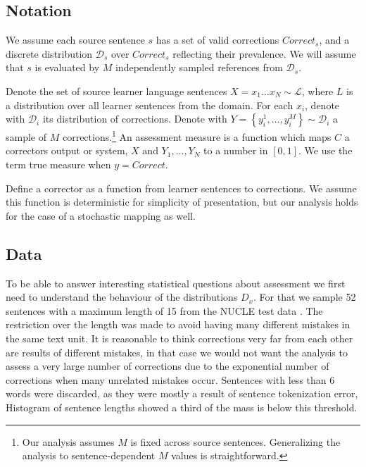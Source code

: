 \documentclass[letter,11pt]{article}
\begin{document}
		
		\subsection{Notation}
		
		We assume each source sentence $s$ has a set of valid corrections $Correct_s$,
		and a discrete distribution $\mathcal{D}_s$ over $Correct_s$ reflecting their prevalence.
		We will assume that $s$ is evaluated by
		$M$ independently sampled references from $\mathcal{D}_s$.
		
		Denote the set of source learner language sentences $X=x_{1}\ldots x_N \sim \mathcal{L}$, where
		$L$ is a distribution over all learner sentences from the domain. For each $x_i$, denote
		with $\mathcal{D}_{i}$ its distribution of corrections.
		Denote with $Y = \left\{y_{i}^{1},\ldots, y_{i}^{M}\right\} \sim \mathcal{D}_{i}$
		a sample of $M$ corrections.\footnote{Our analysis assumes $M$ is fixed across source sentences.
			Generalizing the analysis to sentence-dependent $M$ values is straightforward.}
		An assessment measure is a function which maps $C$ a correctors output or system, $X$ and $Y_1,\ldots,Y_N$ to
		a number in $[0,1]$. We use the term true measure when $y=Correct$.
		
		Define a corrector as a function from learner sentences to corrections.
		We assume this function is deterministic for simplicity of presentation,
		but our analysis holds for the case of a stochastic mapping as well.
		
		
		\subsection{Data}
		
		To be able to answer interesting statistical questions about assessment we first
		need to understand the behaviour of the distributions $D_x$. For that we sample
		52 sentences with a maximum length of 15 from the NUCLE test data
		. The restriction over the length was made to avoid having many different mistakes in the same text unit. It is reasonable to think corrections very far from each other are results of different mistakes, in that case we would not want the analysis to assess a very large number of corrections due to the exponential number of corrections when many unrelated mistakes occur.
		Sentences with less than 6 words were discarded, as they were mostly a result of sentence tokenization error,
		Histogram of sentence lengths showed a third of the mass is below this threshold.
		
\end{document}
